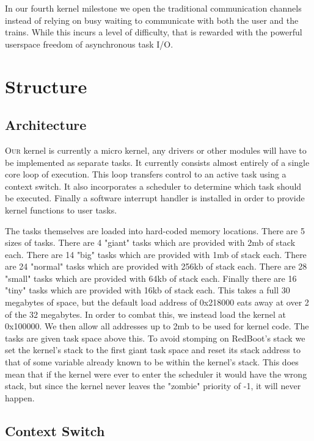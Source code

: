 \documentclass{amsart}
\begin{document}
In our fourth kernel milestone we open the traditional communication channels
instead of relying on busy waiting to communicate with both the user and the
trains. While this incurs a level of difficulty, that is rewarded with the
powerful userspace freedom of asynchronous task I/O.
\section*{Structure}

\subsection*{Architecture}

\textsc{Our} kernel is currently a micro kernel, any drivers or other modules will have
to be implemented as separate tasks. It currently consists almost entirely of a
single core loop of execution. This loop transfers control to an active task
using a context switch. It also incorporates a scheduler to determine which task
should be executed. Finally a software interrupt handler is installed in order
to provide kernel functions to user tasks.

The tasks themselves are loaded into hard-coded memory locations. There are 5
sizes of tasks. There are 4 "giant" tasks which are provided with 2mb of stack
each.  There are 14 "big" tasks which are provided with 1mb of stack each. There
are 24 "normal" tasks which are provided with 256kb of stack each. There are 28
"small" tasks which are provided with 64kb of stack each. Finally there are 16
"tiny" tasks which are provided with 16kb of stack each. This takes a full 30
megabytes of space, but the default load address of 0x218000 eats away at over 2
of the 32 megabytes. In order to combat this, we instead load the kernel at
0x100000. We then allow all addresses up to 2mb to be used for kernel code. The
tasks are given task space above this. To avoid stomping on RedBoot's stack we
set the kernel's stack to the first giant task space and reset its stack address
to that of some variable already known to be within the kernel's stack. This
does mean that if the kernel were ever to enter the scheduler it would have the
wrong stack, but since the kernel never leaves the "zombie" priority of -1, it
will never happen.

\subsection*{Context Switch}
\end{document}
